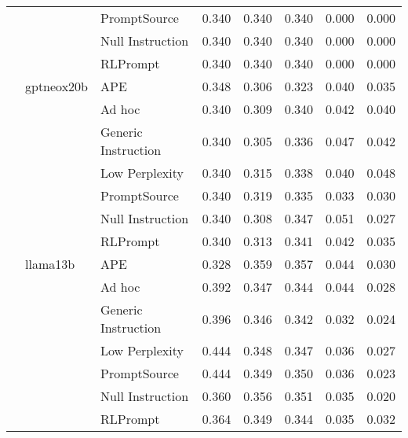 \begin{supertabular}{lllrrrrr}
              &        & PromptSource &            0.340 &           0.340 &          0.340 &        0.000 &    0.000 \\
              &        & Null Instruction &            0.340 &           0.340 &          0.340 &        0.000 &    0.000 \\
              &        & RLPrompt &            0.340 &           0.340 &          0.340 &        0.000 &    0.000 \\
              & gptneox20b & APE &            0.348 &           0.306 &          0.323 &        0.040 &    0.035 \\
              &        & Ad hoc &            0.340 &           0.309 &          0.340 &        0.042 &    0.040 \\
              &        & Generic Instruction &            0.340 &           0.305 &          0.336 &        0.047 &    0.042 \\
              &        & Low Perplexity &            0.340 &           0.315 &          0.338 &        0.040 &    0.048 \\
              &        & PromptSource &            0.340 &           0.319 &          0.335 &        0.033 &    0.030 \\
              &        & Null Instruction &            0.340 &           0.308 &          0.347 &        0.051 &    0.027 \\
              &        & RLPrompt &            0.340 &           0.313 &          0.341 &        0.042 &    0.035 \\
              & llama13b & APE &            0.328 &           0.359 &          0.357 &        0.044 &    0.030 \\
              &        & Ad hoc &            0.392 &           0.347 &          0.344 &        0.044 &    0.028 \\
              &        & Generic Instruction &            0.396 &           0.346 &          0.342 &        0.032 &    0.024 \\
              &        & Low Perplexity &            0.444 &           0.348 &          0.347 &        0.036 &    0.027 \\
              &        & PromptSource &            0.444 &           0.349 &          0.350 &        0.036 &    0.023 \\
              &        & Null Instruction &            0.360 &           0.356 &          0.351 &        0.035 &    0.020 \\
              &        & RLPrompt &            0.364 &           0.349 &          0.344 &        0.035 &    0.032 \\

\end{supertabular}
